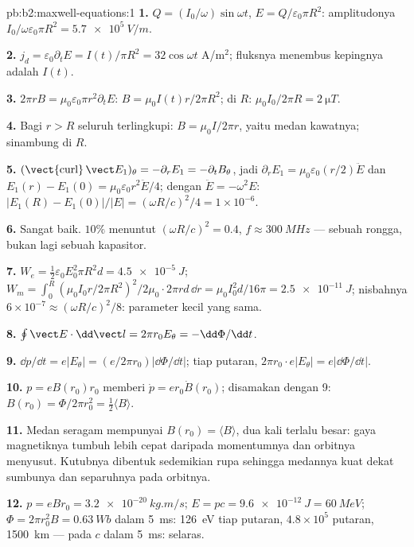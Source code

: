 \begin{solution}{pb:b2:maxwell-equations:1}
\textbf{1.} $Q = (I_0/\omega)\sin\omega t$, $E = Q/\varepsilon_0\pi R^2$: amplitudonya $I_0/\omega\varepsilon_0
\pi R^2 = \qty{5.7e5}{V/m}$.

\textbf{2.} $j_d = \varepsilon_0\partial_tE = I(t)/\pi R^2 = 32\cos\omega t$ A/m$^2$; fluksnya
menembus kepingnya adalah $I(t)$.

\textbf{3.} $2\pi rB = \mu_0\varepsilon_0\pi r^2\partial_tE$: $B = \mu_0I(t)r/2\pi R^2$; di $R$:
$\mu_0I_0/2\pi R = \qty{2}{\micro T}$.

\textbf{4.} Bagi $r > R$ seluruh  terlingkupi: $B =
\mu_0I/2\pi r$, yaitu medan kawatnya; sinambung di $R$.

\textbf{5.} $(\operatorname{\vect{curl}}\vect E_1)_\theta = -\partial_rE_1 = -\partial_tB_\theta$, jadi $\partial_rE_1
= \mu_0\varepsilon_0(r/2)\ddot E$ dan $E_1(r) - E_1(0) = \mu_0\varepsilon_0r^2\ddot E/4$; dengan
$\ddot E = -\omega^2E$: $|E_1(R) - E_1(0)|/|E| = (\omega R/c)^2/4 = 1 \times 10^{-6}$.

\textbf{6.} Sangat baik. $10\%$ menuntut $(\omega R/c)^2 = 0.4$, $f \approx \qty{300}{MHz}$ ---
sebuah rongga, bukan lagi sebuah kapasitor.

\textbf{7.} $W_e = \tfrac12\varepsilon_0E_0^2\pi R^2d = \qty{4.5e-5}{J}$; $W_m = \int_0^R(\mu_0I_0r/
2\pi R^2)^2/2\mu_0\cdot2\pi rd\,\dd r = \mu_0I_0^2d/16\pi = \qty{2.5e-11}{J}$; nisbahnya $6 \times
10^{-7} \approx (\omega R/c)^2/8$: parameter kecil yang sama.

\textbf{8.} $\oint\vect E\cdot\dd\vect l = 2\pi r_0E_\theta = -\dd\Phi/\dd t$.

\textbf{9.} $\dd p/\dd t = e|E_\theta| = (e/2\pi r_0)|\dd\Phi/\dd t|$; tiap putaran,
$2\pi r_0\cdot e|E_\theta| = e|\dd\Phi/\dd t|$.

\textbf{10.} $p = eB(r_0)r_0$ memberi $\dot p = er_0\dot B(r_0)$; disamakan dengan 9:
$B(r_0) = \Phi/2\pi r_0^2 = \tfrac12\langle B\rangle$.

\textbf{11.} Medan seragam mempunyai $B(r_0) = \langle B\rangle$, dua kali terlalu besar:
gaya magnetiknya tumbuh lebih cepat daripada momentumnya dan orbitnya
menyusut. Kutubnya dibentuk sedemikian rupa sehingga medannya kuat dekat
sumbunya dan separuhnya pada orbitnya.

\textbf{12.} $p = eBr_0 = \qty{3.2e-20}{kg.m/s}$; $E = pc = \qty{9.6e-12}{J} = \qty{60}{MeV}$;
$\Phi = 2\pi r_0^2B = \qty{0.63}{Wb}$ dalam \qty{5}{ms}: \qty{126}{eV} tiap putaran, $4.8 \times
10^5$ putaran, \qty{1500}{km} --- pada $c$ dalam \qty{5}{ms}: selaras.


\end{solution}
